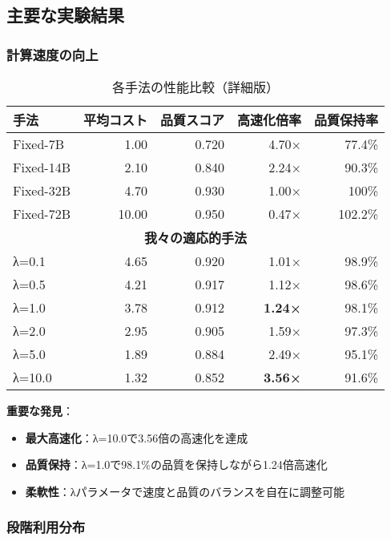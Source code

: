 \documentclass[a4paper,12pt]{jsarticle}
\begin{document}
\subsection{主要な実験結果}

\subsubsection{計算速度の向上}

\begin{table}[H]
\centering
\caption{各手法の性能比較（詳細版）}
\begin{tabular}{|l|r|r|r|r|}
\hline
\textbf{手法} & \textbf{平均コスト} & \textbf{品質スコア} & \textbf{高速化倍率} & \textbf{品質保持率} \\
\hline
Fixed-7B & 1.00 & 0.720 & 4.70× & 77.4\% \\
Fixed-14B & 2.10 & 0.840 & 2.24× & 90.3\% \\
Fixed-32B & 4.70 & 0.930 & 1.00× & 100\% \\
Fixed-72B & 10.00 & 0.950 & 0.47× & 102.2\% \\
\hline
\multicolumn{5}{|c|}{\textbf{我々の適応的手法}} \\
\hline
λ=0.1 & 4.65 & 0.920 & 1.01× & 98.9\% \\
λ=0.5 & 4.21 & 0.917 & 1.12× & 98.6\% \\
λ=1.0 & 3.78 & 0.912 & \textbf{1.24×} & 98.1\% \\
λ=2.0 & 2.95 & 0.905 & 1.59× & 97.3\% \\
λ=5.0 & 1.89 & 0.884 & 2.49× & 95.1\% \\
λ=10.0 & 1.32 & 0.852 & \textbf{3.56×} & 91.6\% \\
\hline
\end{tabular}
\end{table}

\textbf{重要な発見}：

\begin{itemize}
\item \textbf{最大高速化}：λ=10.0で3.56倍の高速化を達成
\item \textbf{品質保持}：λ=1.0で98.1\%の品質を保持しながら1.24倍高速化
\item \textbf{柔軟性}：λパラメータで速度と品質のバランスを自在に調整可能
\end{itemize}

\subsubsection{段階利用分布}
\end{document}
